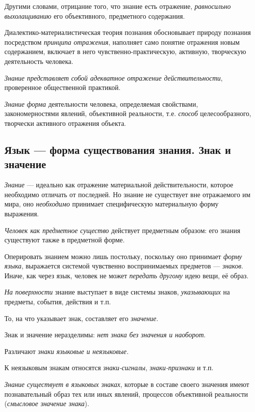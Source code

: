 \documentclass[a4paper,14pt,russian]{extreport}
\begin{document}
Другими словами, отрицание того, что знание есть отражение, \emph{равносильно выхолащиванию} его объективного, предметного содержания.

Диалектико-материалистическая теория познания обосновывает природу познания посредством \emph{принципа отражения}, наполняет само понятие отражения новым содержанием, включает в него чувственно-практическую, активную, творческую деятельность человека.

\emph{Знание представляет собой адекватное отражение действительности}, проверенное общественной практикой.

\emph{Знание} \emph{форма} деятельности человека, определяемая свойствами, закономерностями явлений, объективной реальности, т.е. \emph{способ} целесообразного, творчески активного отражения объекта.

\subsection{Язык --- форма существования знания. Знак и значение}

\emph{Знание} --- идеально как отражение материальной действительности, которое необходимо отличать от последней. Но знание не существует вне отражаемого им мира, оно \emph{необходимо} принимает специфическую материальную форму выражения.

\emph{Человек как предметное существо} действует предметным образом: его знания существуют также в предметной форме.

Оперировать знанием можно лишь постольку, поскольку оно принимает \emph{форму языка}, выражается системой чувственно воспринимаемых предметов --- \emph{знаков}. Иначе, как через язык, человек не может \emph{передать другому} идею вещи, её образ.

\emph{На поверхности} знание выступает в виде системы знаков, \emph{указывающих} на предметы, события, действия и т.п.

То, на что указывает знак, составляет его \emph{значение}.

Знак и значение неразделимы: \emph{нет знака без значения и наоборот}.

Различают \emph{знаки языковые и неязыковые.}

К неязыковым знакам относятся \emph{знаки-сигналы}, \emph{знаки-признаки} и т.п.

\emph{Знание существует в языковых знаках}, которые в составе своего значения имеют познавательный образ тех или иных явлений, процессов объективной реальности (\emph{смысловое значение знака}).
\end{document}
